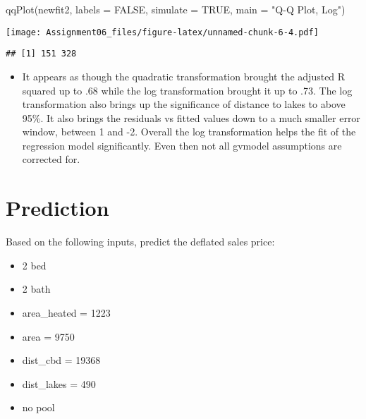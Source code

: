 \documentclass[
]{article}
\newenvironment{Shaded}{\begin{snugshade}}{\end{snugshade}}
\newcommand{\AttributeTok}[1]{\textcolor[rgb]{0.77,0.63,0.00}{#1}}
\newcommand{\ConstantTok}[1]{\textcolor[rgb]{0.00,0.00,0.00}{#1}}
\newcommand{\FunctionTok}[1]{\textcolor[rgb]{0.00,0.00,0.00}{#1}}
\newcommand{\NormalTok}[1]{#1}
\newcommand{\StringTok}[1]{\textcolor[rgb]{0.31,0.60,0.02}{#1}}
\providecommand{\tightlist}{%
  \setlength{\itemsep}{0pt}\setlength{\parskip}{0pt}}
\begin{document}
\begin{Shaded}
\begin{Highlighting}[]
\FunctionTok{qqPlot}\NormalTok{(newfit2, }\AttributeTok{labels =} \ConstantTok{FALSE}\NormalTok{, }\AttributeTok{simulate =} \ConstantTok{TRUE}\NormalTok{, }\AttributeTok{main =} \StringTok{"Q{-}Q Plot, Log"}\NormalTok{)}
\end{Highlighting}
\end{Shaded}

\texttt{[image: Assignment06\_files/figure-latex/unnamed-chunk-6-4.pdf]}

\begin{verbatim}
## [1] 151 328
\end{verbatim}

\begin{itemize}
\tightlist
\item
  It appears as though the quadratic transformation brought the adjusted
  R squared up to .68 while the log transformation brought it up to .73.
  The log transformation also brings up the significance of distance to
  lakes to above 95\%. It also brings the residuals vs fitted values
  down to a much smaller error window, between 1 and -2. Overall the log
  transformation helps the fit of the regression model significantly.
  Even then not all gvmodel assumptions are corrected for.
\end{itemize}

\hypertarget{prediction}{%
\section{Prediction}\label{prediction}}

Based on the following inputs, predict the deflated sales price:

\begin{itemize}
\tightlist
\item
  2 bed
\item
  2 bath
\item
  area\_heated = 1223
\item
  area = 9750
\item
  dist\_cbd = 19368
\item
  dist\_lakes = 490
\item
  no pool
\end{itemize}
\end{document}
